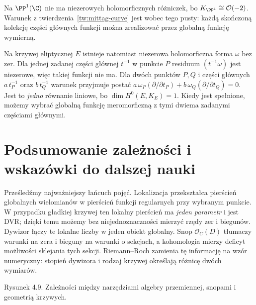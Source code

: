 \begin{przyklad}
Na $\PP^1(\C)$ nie ma niezerowych holomorficznych
różniczek, bo $K_{\PP^1}\cong\mathcal O(-2)$.
Warunek z twierdzenia~\ref{tw:mittag-curve}
jest wobec tego pusty: każdą skończoną kolekcję
części głównych funkcji można zrealizować
przez globalną funkcję wymierną.

Na krzywej eliptycznej $E$ istnieje natomiast
niezerowa holomorficzna forma $\omega$ bez zer.
Dla jednej zadanej części głównej $t^{-1}$ w punkcie
$P$ residuum $(t^{-1}\omega)$ jest niezerowe,
więc takiej funkcji nie ma. Dla dwóch punktów
$P,Q$ i części głównych
$a\,t_P^{-1}$ oraz $b\,t_Q^{-1}$
warunek przyjmuje postać
$a\,\omega_P(\partial/\partial t_P)
+b\,\omega_Q(\partial/\partial t_Q)=0$.
Jest to \emph{jedno} równanie liniowe, bo
$\dim H^0(E,K_E)=1$. Kiedy jest spełnione,
możemy wybrać globalną funkcję meromorficzną
z tymi dwiema zadanymi częściami głównymi.
\end{przyklad}

\section{Podsumowanie zależności i wskazówki do dalszej nauki}
\label{sec:summary-four}

Prześledźmy najważniejszy łańcuch pojęć. Lokalizacja
przekształca pierścień globalnych wielomianów
w pierścień funkcji regularnych przy wybranym
punkcie. W przypadku gładkiej krzywej ten lokalny
pierścień ma \emph{jeden parametr} i jest DVR;
dzięki temu możemy bez niejednoznaczności mierzyć
rzędy zer i biegunów. Dywizor łączy te lokalne
liczby w jeden obiekt globalny. Snop
$\mathcal O_C(D)$ tłumaczy warunki na zera i bieguny
na warunki o sekcjach, a kohomologia mierzy
deficyt możliwości sklejania tych sekcji.
Riemann--Roch zamienia tę informację na wzór
numeryczny: stopień dywizora i rodzaj krzywej
określają różnicę dwóch wymiarów.

\begin{center}

{\small Rysunek 4.9. Zależności między narzędziami algebry przemiennej, snopami i geometrią krzywych.}\par
\end{center}

